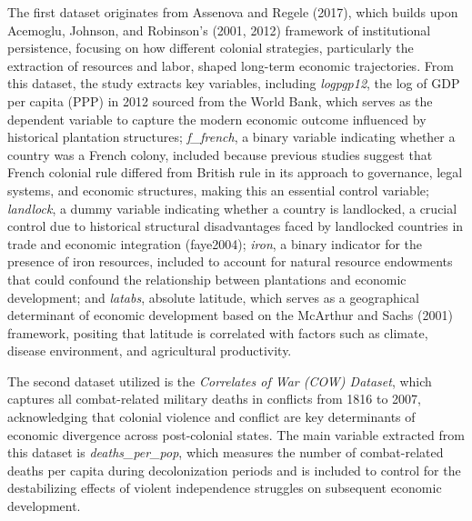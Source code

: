 \documentclass[12pt]{article}
\begin{document}
\vspace{0.2 in}
\noindent The first dataset originates from Assenova and Regele (2017), which builds upon Acemoglu, Johnson, and Robinson’s (2001, 2012) framework of institutional persistence, focusing on how different colonial strategies, particularly the extraction of resources and labor, shaped long-term economic trajectories. From this dataset, the study extracts key variables, including \textit{logpgp12}, the log of GDP per capita (PPP) in 2012 sourced from the World Bank, which serves as the dependent variable to capture the modern economic outcome influenced by historical plantation structures; \textit{f\_french}, a binary variable indicating whether a country was a French colony, included because previous studies suggest that French colonial rule differed from British rule in its approach to governance, legal systems, and economic structures, making this an essential control variable; \textit{landlock}, a dummy variable indicating whether a country is landlocked, a crucial control due to historical structural disadvantages faced by landlocked countries in trade and economic integration (faye2004); \textit{iron}, a binary indicator for the presence of iron resources, included to account for natural resource endowments that could confound the relationship between plantations and economic development; and \textit{latabs}, absolute latitude, which serves as a geographical determinant of economic development based on the McArthur and Sachs (2001) framework, positing that latitude is correlated with factors such as climate, disease environment, and agricultural productivity.

\vspace{0.2 in} 
\noindent The second dataset utilized is the \textit{Correlates of War (COW) Dataset}, which captures all combat-related military deaths in conflicts from 1816 to 2007, acknowledging that colonial violence and conflict are key determinants of economic divergence across post-colonial states. The main variable extracted from this dataset is \textit{deaths\_per\_pop}, which measures the number of combat-related deaths per capita during decolonization periods and is included to control for the destabilizing effects of violent independence struggles on subsequent economic development.
\end{document}
